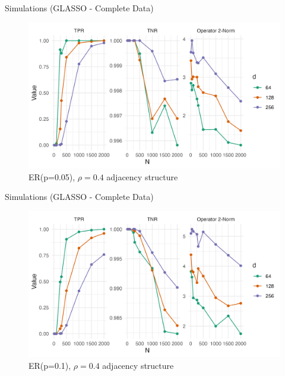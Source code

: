 \documentclass{beamer}
\begin{document}
\begin{frame}{Simulations (GLASSO - Complete Data)}
    \begin{figure}
        \centering 
        \includegraphics[scale=0.65]{glasso_complete_ER_FixN_05.png}
        \caption{ER(p=0.05), $\rho=0.4$ adjacency structure}
    \end{figure}
\end{frame}


\begin{frame}{Simulations (GLASSO - Complete Data)}
    \begin{figure}
        \centering 
        \includegraphics[scale=0.65]{glasso_complete_ER_FixN_1.png}
        \caption{ER(p=0.1), $\rho=0.4$ adjacency structure}
    \end{figure}
\end{frame}
\end{document}
